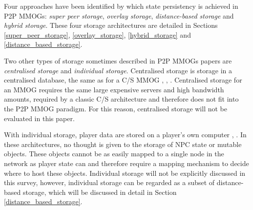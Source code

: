 \documentclass[10pt,a4paper,journal,cspaper,compsoc]{IEEEtran}
\begin{document}
Four approaches have been identified by which state persistency is achieved in P2P MMOGs: \emph{super peer storage}, \emph{overlay storage},
\emph{distance-based storage} and \emph{hybrid storage}. These four storage architectures are detailed in Sections \ref{super_peer_storage},
\ref{overlay_storage}, \ref{hybrid_storage} and \ref{distance_based_storage}.

Two other types of storage sometimes described in P2P MMOGs papers are \emph{centralised storage} and \emph{individual storage}. Centralised storage
is storage in a centralised database, the same as for a C/S MMOG \cite{badumna_engine}, \cite{rooney_centralised_storage},
\cite{hybrid_p2p_cs_centralised}. Centralised storage for an MMOG requires the same large expensive servers and high bandwidth amounts, required by a
classic C/S architecture and therefore does not fit into the P2P MMOG paradigm. For this reason, centralised storage will not be evaluated in this
paper.

With individual storage, player data are stored on a player's own computer \cite{individual_storage1}, \cite{cheat_proof_playout}. In these
architectures, no thought is given to the storage of NPC state or mutable objects. These objects cannot be as easily mapped to a single node in the
network as player state can and therefore require a mapping mechanism to decide where to host these objects. Individual storage will not be
explicitly discussed in this survey, however, individual storage can be regarded as a subset of distance-based storage, which will be discussed in
detail in Section \ref{distance_based_storage}.
\end{document}
